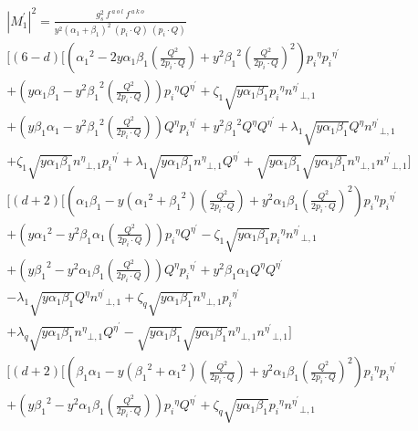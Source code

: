 \pagebreak



\begin{equation}
\begin{split}
{|{M}^{\prime}_1|}^2 =\frac{g_s^2 \:f^{\:a\:o\:l}\: f^{\:a\:k\:o}}{y^2({\alpha_1}+\beta_1)^2\:(p_i\cdot Q) \:(p_i\cdot Q)} \\
[(6-d)[({\alpha_1}^2 -2y\alpha_1 \beta_1(\frac{Q^2}{2p_i \cdot Q})+y^2{\beta_1}^2(\frac{Q^2}{2p_i \cdot Q})^2) {p_i}^{\eta}{p_i}^{{\eta}^{\prime}}\\+(y\alpha_1\beta_1 -{y^2\beta_1}^2(\frac{Q^2}{2p_i \cdot Q})){p_i}^{\eta}{Q}^{{\eta}^{\prime}}+\zeta_1\sqrt{y\alpha_1\beta_1}{p_i}^{\eta}{n^{{\eta}^{\prime}}}_{\bot,1}\\
+(y\beta_1\alpha_1 -y^2{\beta_1}^2(\frac{Q^2}{2p_i \cdot Q})) {Q}^{\eta}{p_i}^{{\eta}^{\prime}}+y^2{\beta_1}^2{Q}^{\eta}{Q}^{{\eta}^{\prime}}+\lambda_1\sqrt{y\alpha_1\beta_1}{Q}^{\eta}{n^{{\eta}^{\prime}}}_{\bot,1}\\
+\zeta_1\sqrt{y\alpha_1\beta_1} {n^{{\eta}}}_{\bot,1}{p_i}^{{\eta}^{\prime}}+\lambda_1\sqrt{y\alpha_1\beta_1}{n^{{\eta}}}_{\bot,1}{Q}^{{\eta}^{\prime}}+\sqrt{y\alpha_1\beta_1}\sqrt{y\alpha_1\beta_1}{n^{{\eta}}}_{\bot,1}{n^{{\eta}^{\prime}}}_{\bot,1}]\\
[(d+2)[(\alpha_1\beta_1-y({\alpha_1}^2+{\beta_1}^2) (\frac{Q^2}{2p_i \cdot Q})+y^2{\alpha_1}{\beta_1}(\frac{Q^2}{2p_i \cdot Q})^2) {p_i}^{\eta}{p_i}^{{\eta}^{\prime}}\\+(y{\alpha_1}^2 -y^2\beta_1\alpha_1(\frac{Q^2}{2p_i \cdot Q})){p_i}^{\eta}{Q}^{{\eta}^{\prime}}-\zeta_1\sqrt{y\alpha_1\beta_1}{p_i}^{\eta}{n^{{\eta}^{\prime}}}_{\bot,1}\\
+(y{\beta_1}^2 -y^2\alpha_1 \beta_1(\frac{Q^2}{2p_i \cdot Q})) {Q}^{\eta}{p_i}^{{\eta}^{\prime}}+y^2\beta_1\alpha_1{Q}^{\eta}{Q}^{{\eta}^{\prime}}\\-\lambda_1\sqrt{y\alpha_1\beta_1}{Q}^{\eta}{n^{{\eta}^{\prime}}}_{\bot,1}
+\zeta_q\sqrt{y\alpha_1\beta_1} {n^{{\eta}}}_{\bot,1}{p_i}^{{\eta}^{\prime}}\\+\lambda_q\sqrt{y\alpha_1\beta_1}{n^{{\eta}}}_{\bot,1}{Q}^{{\eta}^{\prime}}-\sqrt{y\alpha_1\beta_1}\sqrt{y\alpha_1\beta_1}{n^{{\eta}}}_{\bot,1}{n^{{\eta}^{\prime}}}_{\bot,1}]\\
[(d+2)[(\beta_1\alpha_1-y({\beta_1}^2+{\alpha_1}^2)(\frac{Q^2}{2p_i \cdot Q})+y^2\alpha_1\beta_1 (\frac{Q^2}{2p_i \cdot Q})^2) {p_i}^{\eta}{p_i}^{{\eta}^{\prime}}\\+(y{\beta_1}^2 -y^2\alpha_1 \beta_1(\frac{Q^2}{2p_i \cdot Q})){p_i}^{\eta}{Q}^{{\eta}^{\prime}}+\zeta_q\sqrt{y\alpha_1\beta_1}{p_i}^{\eta}{n^{{\eta}^{\prime}}}_{\bot,1}\\

\end{split}
\end{equation}
